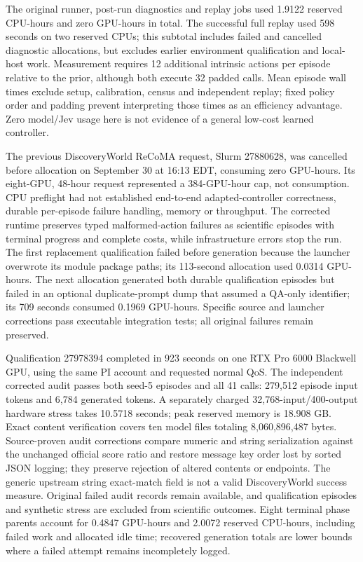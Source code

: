 \documentclass[11pt]{article}
\begin{document}
The original runner, post-run diagnostics and replay jobs used 1.9122 reserved CPU-hours and zero GPU-hours in total. The successful full replay used 598 seconds on two reserved CPUs; this subtotal includes failed and cancelled diagnostic allocations, but excludes earlier environment qualification and local-host work. Measurement requires 12 additional intrinsic actions per episode relative to the prior, although both execute 32 padded calls. Mean episode wall times exclude setup, calibration, census and independent replay; fixed policy order and padding prevent interpreting those times as an efficiency advantage. Zero model/Jev usage here is not evidence of a general low-cost learned controller.

The previous DiscoveryWorld ReCoMA request, Slurm 27880628, was cancelled before allocation on September 30 at 16:13 EDT, consuming zero GPU-hours. Its eight-GPU, 48-hour request represented a 384-GPU-hour cap, not consumption. CPU preflight had not established end-to-end adapted-controller correctness, durable per-episode failure handling, memory or throughput. The corrected runtime preserves typed malformed-action failures as scientific episodes with terminal progress and complete costs, while infrastructure errors stop the run. The first replacement qualification failed before generation because the launcher overwrote its module package paths; its 113-second allocation used 0.0314 GPU-hours. The next allocation generated both durable qualification episodes but failed in an optional duplicate-prompt dump that assumed a QA-only identifier; its 709 seconds consumed 0.1969 GPU-hours. Specific source and launcher corrections pass executable integration tests; all original failures remain preserved.

Qualification 27978394 completed in 923 seconds on one RTX Pro 6000 Blackwell GPU, using the same PI account and requested normal QoS. The independent corrected audit passes both seed-5 episodes and all 41 calls: 279,512 episode input tokens and 6,784 generated tokens. A separately charged 32,768-input/400-output hardware stress takes 10.5718 seconds; peak reserved memory is 18.908 GB. Exact content verification covers ten model files totaling 8,060,896,487 bytes. Source-proven audit corrections compare numeric and string serialization against the unchanged official score ratio and restore message key order lost by sorted JSON logging; they preserve rejection of altered contents or endpoints. The generic upstream string exact-match field is not a valid DiscoveryWorld success measure. Original failed audit records remain available, and qualification episodes and synthetic stress are excluded from scientific outcomes. Eight terminal phase parents account for 0.4847 GPU-hours and 2.0072 reserved CPU-hours, including failed work and allocated idle time; recovered generation totals are lower bounds where a failed attempt remains incompletely logged.
\end{document}
